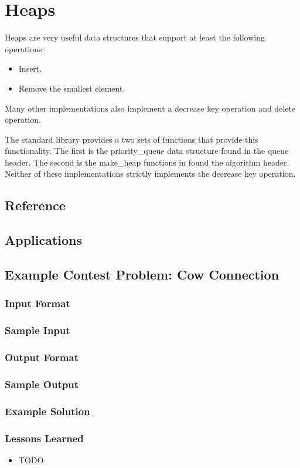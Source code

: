 \section{Heaps}
Heaps are very useful data structures that support at least the following operations:

\begin{itemize}
	\item Insert.
	\item Remove the smallest element.
\end{itemize}

Many other implementations also implement a decrease key operation and delete operation.

The standard library provides a two sets of functions that provide this functionality.
The first is the priority\_queue data structure found in the queue header.
The second is the make\_heap functions in found the algorithm header.
Neither of these implementations strictly implements the decrease key operation.

\subsection{Reference}
\subsection{Applications}
\subsection{Example Contest Problem: Cow Connection}
\subsubsection{Input Format}
\subsubsection{Sample Input}
\subsubsection{Output Format}
\subsubsection{Sample Output}
\subsubsection{Example Solution}
\subsubsection{Lessons Learned}
\begin{itemize}
	\item TODO
\end{itemize}
